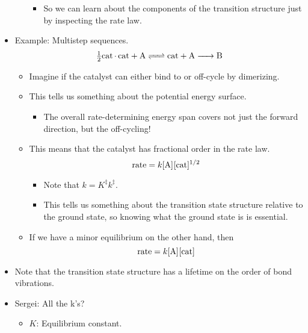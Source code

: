 \documentclass[../notes.tex]{subfiles}
\begin{document}
\begin{itemize}
\begin{itemize}
\begin{equation*}
        \end{equation*}
        \begin{itemize}
            \item So we can learn about the components of the transition structure just by inspecting the rate law.
        \end{itemize}
    \end{itemize}
    \item Example: Multistep sequences.
    \begin{equation*}
        \ce{\tfrac{1}{2}cat*cat + A <=> cat + A -> B}
    \end{equation*}
    \begin{itemize}
        \item Imagine if the catalyst can either bind to  or off-cycle by dimerizing.
        \item This tells us something about the potential energy surface.
        \begin{itemize}
            \item The overall rate-determining energy span covers not just the forward direction, but the off-cycling!
        \end{itemize}
        \item This means that the catalyst has fractional order in the rate law.
        \begin{equation*}
            \text{rate} = k\cnc{A}\cnc{cat}^{1/2}
        \end{equation*}
        \begin{itemize}
            \item Note that $k=K^\ddagger k^\ddagger$.
            \item This tells us something about the transition state structure relative to the ground state, so knowing what the ground state is is essential.
        \end{itemize}
        \item If we have a minor equilibrium on the other hand, then
        \begin{equation*}
            \text{rate} = k\cnc{A}\cnc{cat}
        \end{equation*}
    \end{itemize}
    \item Note that the transition state structure has a lifetime on the order of bond vibrations.
    \item Sergei: All the k's?
    \begin{itemize}
        \item $K$: Equilibrium constant.

\end{itemize}
\end{itemize}
\end{document}
